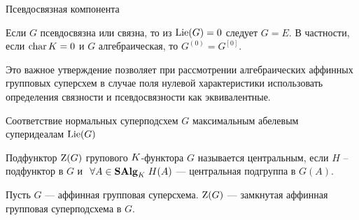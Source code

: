 \begin{subsection}{Псевдосвязная компонента}
  \begin{lemma}
    Если $ G $ псевдосвязна или связна, то из $ \mathrm{Lie}(G) = 0 $ следует $ G = E $.
    В частности, если $ \mathop{\mathrm{char}}K = 0 $ и $ G $ алгебраическая, то $ G^{(0)} = G^{[0]} $.
  \end{lemma}

  Это важное утверждение позволяет при рассмотрении алгебраических
  аффинных групповых суперсхем в случае поля нулевой характеристики
  использовать определения связности и псевдосвязности как эквивалентные.

\end{subsection}


\begin{subsection}{Соответствие нормальных суперподсхем $ G $
                   максимальным абелевым суперидеалам $ \mathrm{Lie}(G) $ }
  \begin{definition}
    Подфунктор $ \mathrm{Z}(G) $ групового $ K $-функтора $ G $ называется центральным,
    если $ H $ -- подфунктор в $ G $ и $ ~\forall A \in \mathbf{SAlg}_K \; H(A) $ ---
    центральная подгруппа в $ G(A) $.
  \end{definition}

  \begin{proposition} \label{Z(G) closed in G}
    Пусть $ G $ --- аффинная групповая суперсхема.
    $ \mathrm{Z}(G) $ --- замкнутая аффинная групповая суперподсхема в $ G $.
\end{proposition}
\end{subsection}
